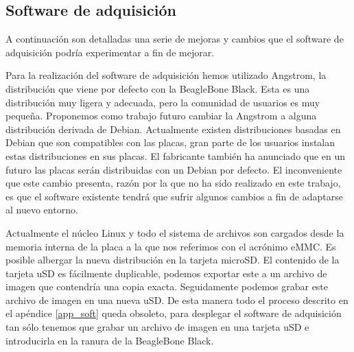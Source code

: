 	\subsection{Software de adquisición}
		A continuación son detalladas una serie de mejoras y cambios que el software de adquisición podría experimentar a fin de mejorar.
		\begin{description}[style=unboxed,leftmargin=0cm,labelwidth=1cm]
			\item[Debian]
				Para la realización del software de adquisición hemos utilizado Angstrom, la distribución que viene por defecto con la
				BeagleBone Black. Esta es una distribución muy ligera y adecuada, pero la comunidad de usuarios es muy pequeña.
				Proponemos como trabajo futuro cambiar la Angstrom a alguna distribución derivada de Debian. Actualmente existen
				distribuciones basadas en Debian que son compatibles con las placas, gran parte de los usuarios instalan estas
				distribuciones en sus placas. El fabricante también ha anunciado que en un futuro las placas serán distribuidas con un
				Debian por defecto. El inconveniente que este cambio presenta, razón por la que no ha sido realizado en este trabajo,
				es que el software existente tendrá que sufrir algunos cambios a fin de adaptarse al nuevo entorno.
				\par
				Actualmente el núcleo Linux y todo el sistema de archivos son cargados desde la memoria interna de la placa a la que
				nos referimos con el acrónimo eMMC. Es posible albergar la nueva distribución en la tarjeta microSD. El contenido de
				la tarjeta uSD es fácilmente duplicable, podemos exportar este a un archivo de imagen que contendría una copia exacta.
				Seguidamente podemos grabar este archivo de imagen en una nueva uSD. De esta manera todo el proceso descrito en el
				apéndice \ref{app_soft} queda obsoleto, para desplegar el software de adquisición tan sólo tenemos que grabar un
				archivo de imagen en una tarjeta uSD e introducirla en la ranura de la BeagleBone Black. 
		\end{description}

